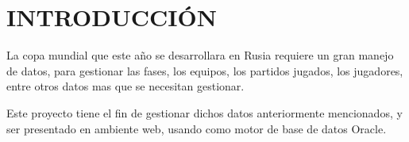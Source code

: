 \chapter{INTRODUCCIÓN}

La copa mundial que este año se desarrollara en Rusia requiere un gran manejo de datos, para gestionar las fases, los equipos, los partidos jugados, los jugadores, entre otros datos mas que se necesitan gestionar.

\vspace{5mm}
Este proyecto tiene el fin de gestionar dichos datos anteriormente mencionados, y ser presentado en ambiente web, usando como motor de base de datos Oracle.